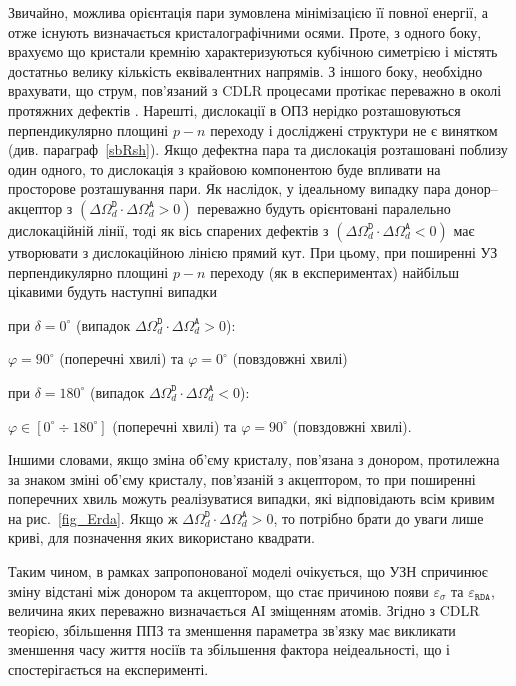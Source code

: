 Звичайно, можлива орієнтація пари зумовлена мінімізацією її повної енергії, а отже існують визначається кристалографічними осями.
Проте, з одного боку, врахуємо що кристали кремнію характеризуються кубічною симетрією і містять достатньо велику кількість еквівалентних напрямів.
З  іншого боку, необхідно врахувати,
що струм, пов'язаний з CDLR процесами протікає переважно в околі протяжних дефектів \cite{CDLR:JAP,CDLR:SSP}.
Нарешті, дислокації в ОПЗ нерідко розташовуються перпендикулярно площині $p-n$ переходу
і досліджені структури не є винятком (див. параграф~\ref{sbRsh}).
Якщо дефектна пара та дислокація розташовані поблизу один одного, то дислокація з крайовою компонентою буде впливати на просторове розташування пари.
Як наслідок, у ідеальному випадку пара донор--акцептор з  $(\Delta\Omega_d^\mathtt{D}\cdot\Delta\Omega_d^\mathtt{A}>0)$ переважно будуть орієнтовані
паралельно дислокаційній лінії,
тоді як вісь спарених дефектів з $(\Delta\Omega_d^\mathtt{D}\cdot\Delta\Omega_d^\mathtt{A}<0)$ має утворювати з дислокаційною лінією прямий кут.
При цьому, при поширенні УЗ перпендикулярно площині $p-n$ переходу (як в експериментах)
найбільш цікавими будуть наступні випадки

\noindent при  $\delta=0^\circ$ (випадок $\Delta\Omega_d^\mathtt{D}\cdot\Delta\Omega_d^\mathtt{A}>0$):
\begin{center}
\noindent   $\varphi=90^\circ$ (поперечні хвилі)  та $\varphi=0^\circ$ (повздовжні хвилі)
\end{center}

\noindent при  $\delta=180^\circ$ (випадок $\Delta\Omega_d^\mathtt{D}\cdot\Delta\Omega_d^\mathtt{A}<0$):
\begin{center}
\noindent   $\varphi\in[0^\circ\div 180^\circ]$ (поперечні хвилі)  та $\varphi=90^\circ$ (повздовжні хвилі).
\end{center}

Іншими словами,
якщо зміна об'єму кристалу, пов'язана з донором, протилежна за знаком зміні об'єму кристалу, пов'язаній з акцептором, то
при поширенні поперечних хвиль можуть реалізуватися випадки, які відповідають всім кривим на рис.~\ref{fig_Erda}.
Якщо ж $\Delta\Omega_d^\mathtt{D}\cdot\Delta\Omega_d^\mathtt{A}>0$, то потрібно брати до уваги лише криві, для позначення
яких використано квадрати.


Таким чином, в рамках запропонованої моделі очікується, що УЗН спричинює зміну відстані між донором та акцептором,
що стає причиною появи $\varepsilon_{\sigma}$ та $\varepsilon_{\mathtt{RDA}}$, величина яких переважно визначається АІ зміщенням атомів.
Згідно з CDLR теорією,
збільшення ППЗ та зменшення параметра зв'язку має викликати зменшення часу життя носіїв та збільшення фактора неідеальності,
що і спостерігається на експерименті.


